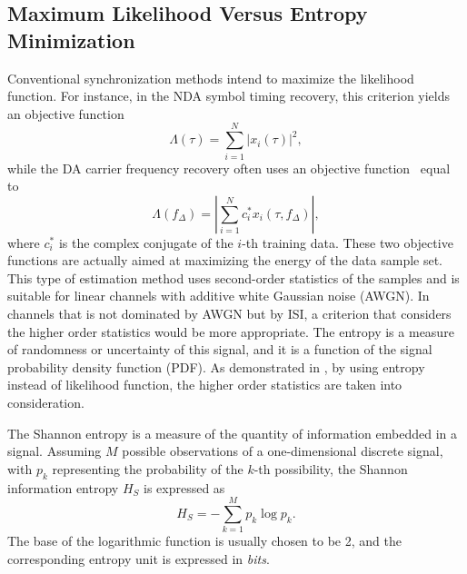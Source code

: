 \documentclass[journal,comsoc, onecolumn, 12pt,draftclsnofoot]{IEEEtran} %
\begin{document}
\subsection{Maximum Likelihood Versus Entropy Minimization}
Conventional synchronization methods intend to maximize the likelihood function.
For instance, in the NDA symbol timing recovery, this criterion yields an objective function~\cite{mengali1997synchronization}
\begin{equation}
\Lambda(\tau) =\sum\limits_{i = 1}^N {{{\left| {{x_i}( \tau )} \right|}^2}}, 
\end{equation}
while the DA carrier frequency recovery often uses an objective function~\cite{mengali1997synchronization} equal to
\begin{equation}
\Lambda ({f_\Delta })=\left| \sum\limits_{i = 1}^N {{{{c_i^*{x_i}(\tau ,{f_\Delta })}}}} \right|, 
\end{equation}
where \(c_i^*\) is the complex conjugate of the \(i\)-th training data.
These two objective functions are actually aimed at maximizing the energy of the data sample set.
This type of estimation method uses second-order statistics of the samples and is suitable for linear channels with additive white Gaussian noise (AWGN).
In channels that is not dominated by AWGN but by ISI, a criterion that considers the higher order statistics would be more appropriate.
The entropy is a measure of randomness or uncertainty of this signal, and it is a function of the signal probability density function (PDF).
As demonstrated in \cite{Santamaria2002}, by using entropy instead of likelihood function, the higher order statistics are taken into consideration.

The Shannon entropy is a measure of the quantity of information  embedded in a signal.
Assuming \(M\) possible observations of a one-dimensional discrete signal, with \(p_k\) representing the probability of the \(k\)-th possibility, the Shannon information entropy \(H_S\) is expressed as \cite{Shannon1948}
\begin{equation}
H_S =  - \sum\limits_{k = 1}^M {{p_k}\log {p_k}}.
\label{eq:entropy}
\end{equation}
The base of the logarithmic function is usually chosen to be 2, and the corresponding entropy unit is expressed in \textit{bits}.
\end{document}

